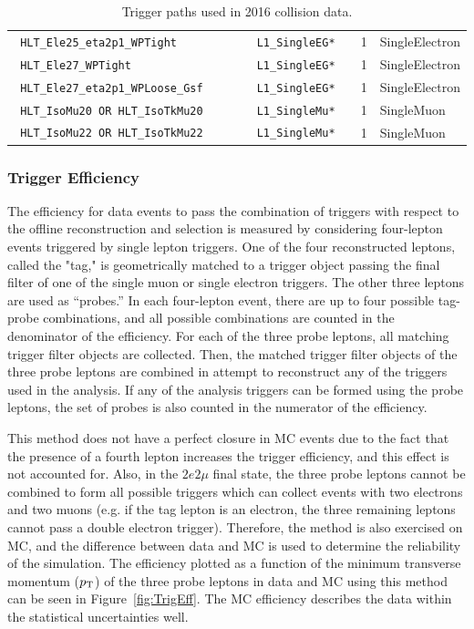 \begin{table}[h]
\begin{tabular}{l|l|c|l}
\verb| HLT_Ele25_eta2p1_WPTight                        | & \verb| L1_SingleEG*         |  & 1 & SingleElectron \\
\verb| HLT_Ele27_WPTight                               | & \verb| L1_SingleEG*         |  & 1 & SingleElectron \\
\verb| HLT_Ele27_eta2p1_WPLoose_Gsf                    | & \verb| L1_SingleEG*         |  & 1 & SingleElectron \\
\verb| HLT_IsoMu20 OR HLT_IsoTkMu20                    | & \verb| L1_SingleMu*         |  & 1 & SingleMuon \\
\verb| HLT_IsoMu22 OR HLT_IsoTkMu22                    | & \verb| L1_SingleMu*         |  & 1 & SingleMuon \\
\hline %
    \end{tabular}
    \caption{Trigger paths used in 2016 collision data.}
    \label{tab:triggerPaths}
\end{table}


\subsubsection{Trigger Efficiency}

The efficiency for data events to pass the combination of triggers with respect to the offline reconstruction and selection is measured
by considering four-lepton events triggered by single lepton triggers. One of the four reconstructed leptons, called the "tag," is geometrically matched 
to a trigger object passing the final filter of one of the single muon or single electron triggers. The other three leptons are 
used as ``probes.'' In each four-lepton event, there are up to four possible tag-probe combinations, and all possible combinations are counted in the
denominator of the efficiency. For each of the three probe leptons, all matching trigger filter objects are collected. Then, the matched trigger filter
objects of the three probe leptons are combined in attempt to reconstruct any of the triggers used in the analysis. If any of the analysis triggers
can be formed using the probe leptons, the set of probes is also counted in the numerator of the efficiency.

This method does not have a perfect closure in MC events due to the fact that the presence of a fourth lepton increases the trigger efficiency,
and this effect is not accounted for. Also, in the  $2e2\mu$ final state, the three probe leptons cannot be combined to form all possible triggers which 
can collect events with two electrons and two muons (e.g. if the tag lepton is an electron, the three remaining leptons cannot pass a double electron
trigger). Therefore, the method is also exercised on MC, and the difference between data and MC is used to determine the reliability of the simulation.
 The efficiency plotted as a function of the minimum transverse momentum ($p_{\rm{T}}$) of the three probe leptons in data and MC using this method can be seen in 
Figure~\ref{fig:TrigEff}. The MC efficiency describes the data within the statistical uncertainties well.

